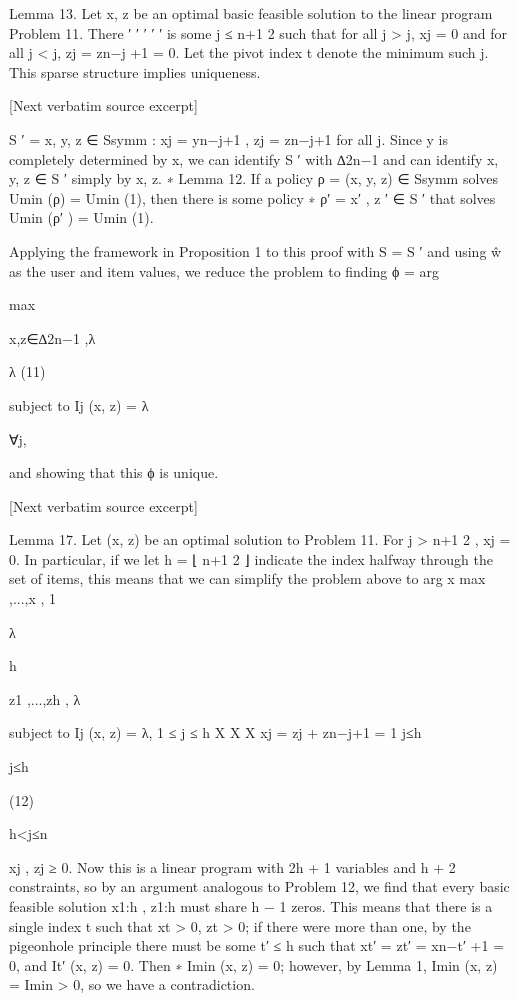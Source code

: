 \documentclass[10pt]{article}
\begin{document}
\begin{ReviewVerbatim}
Lemma 13. Let x, z be an optimal basic feasible solution to the linear program Problem 11. There
′
′
′
′
′
is some j ≤ n+1
2 such that for all j > j, xj = 0 and for all j < j, zj = zn−j +1 = 0. Let the
pivot index t denote the minimum such j.
This sparse structure implies uniqueness.

[Next verbatim source excerpt]

S ′ = {x, y, z ∈ Ssymm : xj = yn−j+1 , zj = zn−j+1 for all j}.
Since y is completely determined by x, we can identify S ′ with ∆2n−1 and can identify x, y, z ∈ S ′
simply by x, z.
∗
Lemma 12. If a policy ρ = (x, y, z) ∈ Ssymm solves Umin (ρ) = Umin
(1), then there is some policy
∗
ρ′ = x′ , z ′ ∈ S ′ that solves Umin (ρ′ ) = Umin
(1).

Applying the framework in Proposition 1 to this proof with S = S ′ and using ŵ as the user and item
values, we reduce the problem to finding
ϕ = arg

max

x,z∈∆2n−1 ,λ

λ
(11)

subject to Ij (x, z) = λ

∀j,

and showing that this ϕ is unique.

[Next verbatim source excerpt]

Lemma 17. Let (x, z) be an optimal solution to Problem 11. For j > n+1
2 , xj = 0.
In particular, if we let h = ⌊ n+1
2 ⌋ indicate the index halfway through the set of items, this means that
we can simplify the problem above to
arg x max
,...,x ,
1

λ

h

z1 ,...,zh ,
λ

subject to Ij (x, z) = λ, 1 ≤ j ≤ h
X
X
X
xj =
zj +
zn−j+1 = 1
j≤h

j≤h

(12)

h<j≤n

xj , zj ≥ 0.
Now this is a linear program with 2h + 1 variables and h + 2 constraints, so by an argument analogous
to Problem 12, we find that every basic feasible solution x1:h , z1:h must share h − 1 zeros. This means
that there is a single index t such that xt > 0, zt > 0; if there were more than one, by the pigeonhole
principle there must be some t′ ≤ h such that xt′ = zt′ = xn−t′ +1 = 0, and It′ (x, z) = 0. Then
∗
Imin (x, z) = 0; however, by Lemma 1, Imin (x, z) = Imin
> 0, so we have a contradiction.
\end{ReviewVerbatim}
\end{document}
